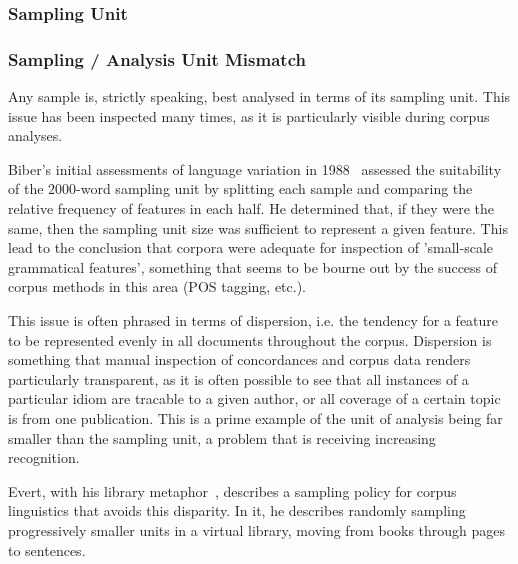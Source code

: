 



\subsubsection{Sampling Unit}

\subsubsection{Sampling / Analysis Unit Mismatch}
Any sample is, strictly speaking, best analysed in terms of its sampling unit. This issue has been inspected many times, as it is particularly visible during corpus analyses.

Biber's initial assessments of language variation in 1988~\cite{biber1988variation} assessed the suitability of the $2000$-word sampling unit by splitting each sample and comparing the relative frequency of features in each half.  He determined that, if they were the same, then the sampling unit size was sufficient to represent a given feature.  This lead to the conclusion that corpora were adequate for inspection of 'small-scale grammatical features', something that seems to be bourne out by the success of corpus methods in this area (POS tagging, etc.).

This issue is often phrased in terms of dispersion, i.e. the tendency for a feature to be represented evenly in all documents throughout the corpus.  Dispersion is something that manual inspection of concordances and corpus data renders particularly transparent, as it is often possible to see that all instances of a particular idiom are tracable to a given author, or all coverage of a certain topic is from one publication.  This is a prime example of the unit of analysis being far smaller than the sampling unit, a problem that is receiving increasing recognition.

Evert, with his library metaphor~\cite{evert2006random}, describes a sampling policy for corpus linguistics that avoids this disparity.  In it, he describes randomly sampling progressively smaller units in a virtual library, moving from books through pages to sentences.%

